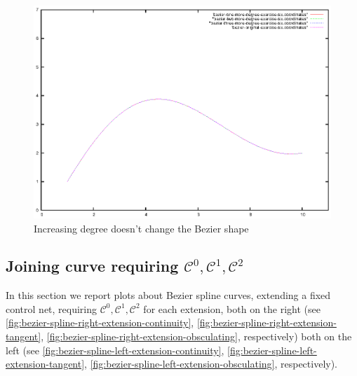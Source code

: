 \documentclass{article}
\begin{document}
\begin{figure}[h!]
  \centering
  \includegraphics{bezier-deCasteljau-curves/exercise-six-one-more-degree-comparison}
  \caption{Increasing degree doesn't change the Bezier shape}
  \label{fig:increasing-degree-does-change-curve}
\end{figure}

\subsection{Joining curve requiring $\mathcal{C}^0, \mathcal{C}^1, \mathcal{C}^2$}

In this section we report plots about Bezier spline curves,
extending a fixed control net, requiring $\mathcal{C}^0,
\mathcal{C}^1, \mathcal{C}^2$ for each extension, both on the right
(see
\autoref{fig:bezier-spline-right-extension-continuity},
\autoref{fig:bezier-spline-right-extension-tangent},
\autoref{fig:bezier-spline-right-extension-obsculating},
respectively) both on the left (see
\autoref{fig:bezier-spline-left-extension-continuity},
\autoref{fig:bezier-spline-left-extension-tangent},
\autoref{fig:bezier-spline-left-extension-obsculating},
respectively).
\end{document}
